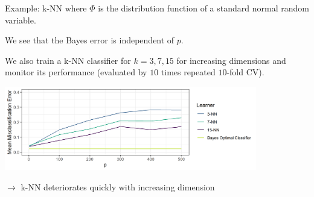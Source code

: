 \documentclass[11pt,compress,t,notes=noshow, xcolor=table]{beamer}
\begin{document}
\begin{vbframe}{Example: k-NN}
where $\Phi$ is the distribution function of a standard normal random variable. 

\lz 

We see that the Bayes error is independent of $p$. 


\framebreak

We also train a k-NN classifier for $k = 3, 7, 15$ for increasing dimensions and monitor its performance (evaluated by $10$ times repeated $10$-fold CV).
\medskip

\begin{center}
\includegraphics[width = 11cm ]{figure/knn_misclassification_plot.png}
\end{center}

$\to$ k-NN deteriorates quickly with increasing dimension


\end{vbframe}
\end{document}
